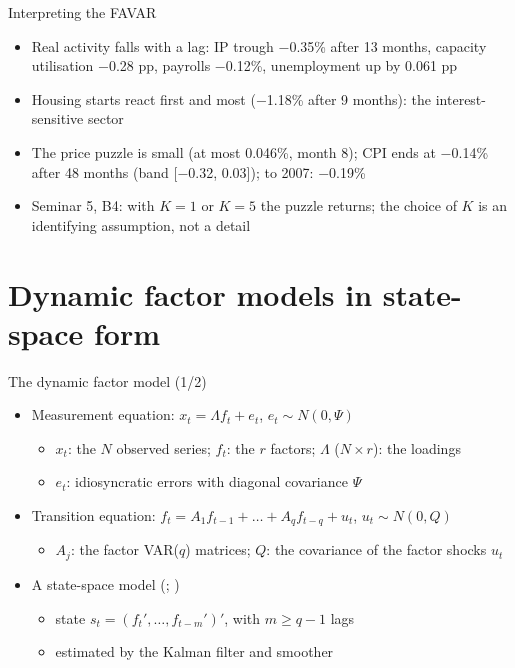 \begin{frame}{Interpreting the FAVAR}
\itemsize{\small}
\begin{itemize}
    \item Real activity falls with a lag: IP trough \ensuremath{-}0.35\% after 13 months, capacity utilisation \ensuremath{-}0.28 pp, payrolls \ensuremath{-}0.12\%, unemployment up by 0.061 pp
    \item Housing starts react first and most (\ensuremath{-}1.18\% after 9 months): the interest-sensitive sector
    \item The price puzzle is small (at most 0.046\%, month 8); CPI ends at \ensuremath{-}0.14\% after 48 months (band [\ensuremath{-}0.32, 0.03]); to 2007: \ensuremath{-}0.19\%
    \item Seminar 5, B4: with $K = 1$ or $K = 5$ the puzzle returns; the choice of $K$ is an identifying assumption, not a detail
\end{itemize}
\end{frame}


\section{Dynamic factor models in state-space form}

\begin{frame}{The dynamic factor model (1/2)}
\itemsize{\small}
\begin{itemize}
    \item Measurement equation: $x_t = \Lambda f_t + e_t$, $e_t \sim N(0, \Psi)$
    \begin{itemize}
        \item $x_t$: the $N$ observed series; $f_t$: the $r$ factors; $\Lambda$ ($N\times r$): the loadings
        \item $e_t$: idiosyncratic errors with diagonal covariance $\Psi$
    \end{itemize}
    \item Transition equation: $f_t = A_1f_{t-1} + \dots + A_qf_{t-q} + u_t$, $u_t \sim N(0, Q)$
    \begin{itemize}
        \item $A_j$: the factor VAR($q$) matrices; $Q$: the covariance of the factor shocks $u_t$
    \end{itemize}
    \item A state-space model (; )
    \begin{itemize}
        \item state $s_t = (f_t', \dots, f_{t-m}')'$, with $m \ge q - 1$ lags
        \item estimated by the Kalman filter and smoother
    \end{itemize}
\end{itemize}
\end{frame}


